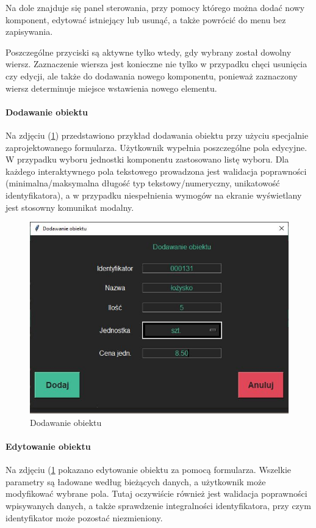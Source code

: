 \documentclass[12pt,twoside]{article}
\begin{document}
Na dole znajduje się panel sterowania, przy pomocy którego można dodać nowy komponent, edytować istniejący lub usunąć, a także powrócić do menu bez zapisywania.

Poszczególne przyciski są aktywne tylko wtedy, gdy wybrany został dowolny wiersz. Zaznaczenie wiersza jest konieczne nie tylko w przypadku chęci usunięcia czy edycji, ale także do dodawania nowego komponentu, ponieważ zaznaczony wiersz determinuje miejsce wstawienia nowego elementu.

\paragraph*{Dodawanie obiektu}

Na zdjęciu (\ref{fig:app:bom_add_item}) przedstawiono przykład dodawania obiektu przy użyciu specjalnie zaprojektowanego formularza. Użytkownik wypełnia poszczególne pola edycyjne. W przypadku wyboru jednostki komponentu zastosowano listę wyboru. Dla każdego interaktywnego pola tekstowego prowadzona jest walidacja poprawności (minimalna/maksymalna długość typ tekstowy/numeryczny, unikatowość identyfikatora), a w przypadku niespełnienia wymogów na ekranie wyświetlany jest stosowny komunikat modalny.

\begin{figure}[ht]
	\centering
	\includegraphics[width=\textwidth]{figures/app/bom_add_item.jpg}
	\caption{Dodawanie obiektu}
\label{fig:app:bom_add_item}
\end{figure}

\paragraph*{Edytowanie obiektu}
Na zdjęciu (\ref{fig:app:bom_add_item} pokazano edytowanie obiektu za pomocą formularza. Wszelkie parametry są ładowane według bieżących danych, a użytkownik może modyfikować wybrane pola. Tutaj oczywiście również jest walidacja poprawności wpisywanych danych, a także sprawdzenie integralności identyfikatora, przy czym identyfikator może pozostać niezmieniony. 
\end{document}
